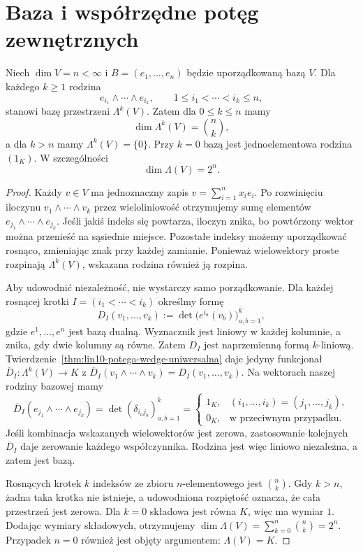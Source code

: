 \section{Baza i współrzędne potęg zewnętrznych}
\label{sec:lin10-baza-wedge}

\begin{twierdzenie}
\label{thm:lin10-zew-baza}
Niech \(\dim V=n<\infty\)
i \(B=(e_1,\ldots,e_n)\)
będzie uporządkowaną bazą \(V\).
Dla każdego \(k\ge1\)
rodzina
\[
 e_{i_1}\wedge\cdots\wedge e_{i_k},
 \qquad
 1\leq i_1<\cdots<i_k\leq n,
\]
stanowi bazę przestrzeni \(\Lambda^k(V)\).
Zatem dla \(0\leq k\leq n\)
mamy
\[
 \dim\Lambda^k(V)=\binom nk,
\]
a dla \(k>n\) mamy
\(\Lambda^k(V)=\{0\}\).
Przy \(k=0\) bazą jest
jednoelementowa rodzina \((1_K)\).
W szczególności
\[
 \dim\Lambda(V)=2^n.
\]
\end{twierdzenie}
\begin{proof}
Każdy \(v\in V\) ma jednoznaczny
zapis \(v=\sum_{i=1}^n x_ie_i\).
Po rozwinięciu iloczynu
\(v_1\wedge\cdots\wedge v_k\)
przez wieloliniowość otrzymujemy
sumę elementów
\(e_{j_1}\wedge\cdots\wedge e_{j_k}\).
Jeśli jakiś indeks się powtarza,
iloczyn znika, bo powtórzony
wektor można przenieść na
sąsiednie miejsce.
Pozostałe indeksy możemy
uporządkować rosnąco, zmieniając
znak przy każdej zamianie.
Ponieważ wielowektory proste
rozpinają \(\Lambda^k(V)\),
wskazana rodzina również ją rozpina.

Aby udowodnić niezależność,
nie wystarczy samo porządkowanie.
Dla każdej rosnącej krotki
\(I=(i_1<\cdots<i_k)\)
określmy formę
\[
 D_I(v_1,\ldots,v_k)
 :=\det\bigl(e^{i_a}(v_b)\bigr)_{a,b=1}^k,
\]
gdzie \(e^1,\ldots,e^n\)
jest bazą dualną.
Wyznacznik jest liniowy
w każdej kolumnie, a znika,
gdy dwie kolumny są równe.
Zatem \(D_I\) jest naprzemienną
formą \(k\)-liniową.
Twierdzenie~\ref{thm:lin10-potega-wedge-uniwersalna}
daje jedyny funkcjonał
\(\overline D_I\colon\Lambda^k(V)\to K\)
z
\(\overline D_I(v_1\wedge\cdots\wedge v_k)
=D_I(v_1,\ldots,v_k)\).
Na wektorach naszej rodziny
bazowej mamy
\[
 \overline D_I(e_{j_1}\wedge\cdots\wedge e_{j_k})
 =\det(\delta_{i_a j_b})_{a,b=1}^k
 =\begin{cases}
   1_K,&(i_1,\ldots,i_k)=(j_1,\ldots,j_k),\\
   0_K,&\text{w przeciwnym przypadku}.
  \end{cases}
\]
Jeśli kombinacja wskazanych
wielowektorów jest zerowa,
zastosowanie kolejnych
\(\overline D_I\) daje
zerowanie każdego współczynnika.
Rodzina jest więc liniowo
niezależna, a zatem jest bazą.

Rosnących krotek \(k\) indeksów
ze zbioru \(n\)-elementowego
jest \(\binom nk\).
Gdy \(k>n\), żadna taka
krotka nie istnieje, a
udowodniona rozpiętość oznacza,
że cała przestrzeń jest zerowa.
Dla \(k=0\) składowa jest równa
\(K\), więc ma wymiar \(1\).
Dodając wymiary składowych,
otrzymujemy
\(\dim\Lambda(V)=\sum_{k=0}^n\binom nk
=2^n\). Przypadek \(n=0\)
również jest objęty argumentem:
\(\Lambda(V)=K\).
\end{proof}

